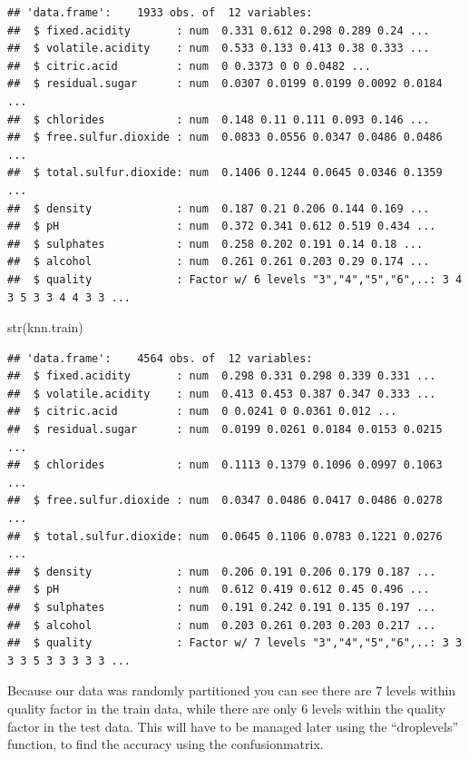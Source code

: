 \documentclass[
]{book}
\newenvironment{Shaded}{\begin{snugshade}}{\end{snugshade}}
\newcommand{\FunctionTok}[1]{\textcolor[rgb]{0.00,0.00,0.00}{#1}}
\newcommand{\NormalTok}[1]{#1}
\begin{document}
\begin{verbatim}
## 'data.frame':    1933 obs. of  12 variables:
##  $ fixed.acidity       : num  0.331 0.612 0.298 0.289 0.24 ...
##  $ volatile.acidity    : num  0.533 0.133 0.413 0.38 0.333 ...
##  $ citric.acid         : num  0 0.3373 0 0 0.0482 ...
##  $ residual.sugar      : num  0.0307 0.0199 0.0199 0.0092 0.0184 ...
##  $ chlorides           : num  0.148 0.11 0.111 0.093 0.146 ...
##  $ free.sulfur.dioxide : num  0.0833 0.0556 0.0347 0.0486 0.0486 ...
##  $ total.sulfur.dioxide: num  0.1406 0.1244 0.0645 0.0346 0.1359 ...
##  $ density             : num  0.187 0.21 0.206 0.144 0.169 ...
##  $ pH                  : num  0.372 0.341 0.612 0.519 0.434 ...
##  $ sulphates           : num  0.258 0.202 0.191 0.14 0.18 ...
##  $ alcohol             : num  0.261 0.261 0.203 0.29 0.174 ...
##  $ quality             : Factor w/ 6 levels "3","4","5","6",..: 3 4 3 5 3 3 4 4 3 3 ...
\end{verbatim}

\begin{Shaded}
\begin{Highlighting}[]
\FunctionTok{str}\NormalTok{(knn.train)}
\end{Highlighting}
\end{Shaded}

\begin{verbatim}
## 'data.frame':    4564 obs. of  12 variables:
##  $ fixed.acidity       : num  0.298 0.331 0.298 0.339 0.331 ...
##  $ volatile.acidity    : num  0.413 0.453 0.387 0.347 0.333 ...
##  $ citric.acid         : num  0 0.0241 0 0.0361 0.012 ...
##  $ residual.sugar      : num  0.0199 0.0261 0.0184 0.0153 0.0215 ...
##  $ chlorides           : num  0.1113 0.1379 0.1096 0.0997 0.1063 ...
##  $ free.sulfur.dioxide : num  0.0347 0.0486 0.0417 0.0486 0.0278 ...
##  $ total.sulfur.dioxide: num  0.0645 0.1106 0.0783 0.1221 0.0276 ...
##  $ density             : num  0.206 0.191 0.206 0.179 0.187 ...
##  $ pH                  : num  0.612 0.419 0.612 0.45 0.496 ...
##  $ sulphates           : num  0.191 0.242 0.191 0.135 0.197 ...
##  $ alcohol             : num  0.203 0.261 0.203 0.203 0.217 ...
##  $ quality             : Factor w/ 7 levels "3","4","5","6",..: 3 3 3 3 5 3 3 3 3 3 ...
\end{verbatim}

Because our data was randomly partitioned you can see there are 7 levels within quality factor in the train data, while there are only 6 levels within the quality factor in the test data. This will have to be managed later using the ``droplevels'' function, to find the accuracy using the confusionmatrix.
\end{document}
